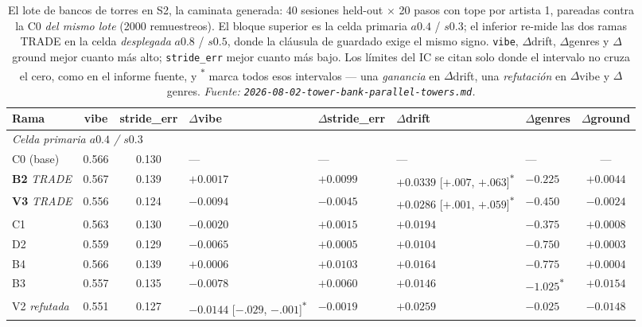 \documentclass[11pt]{article}
\begin{document}
\begin{table}[ht]
  \centering
  \caption{El lote de bancos de torres en S2, la caminata generada: \num{40}
  sesiones held-out $\times$ \num{20} pasos con tope por artista 1, pareadas
  contra la C0 \emph{del mismo lote} (\num{2000} remuestreos). El bloque superior
  es la celda primaria $a\num{0.4}$ / $s\num{0.3}$; el inferior re-mide las dos
  ramas TRADE en la celda \emph{desplegada} $a\num{0.8}$ / $s\num{0.5}$, donde la
  cláusula de guardado exige el mismo signo. \texttt{vibe}, $\Delta$drift,
  $\Delta$genres y $\Delta$ground mejor cuanto más alto; \texttt{stride\_err}
  mejor cuanto más bajo. Los límites del IC se citan solo donde el intervalo no
  cruza el cero, como en el informe fuente, y \textsuperscript{$\ast$} marca todos
  esos intervalos --- una \emph{ganancia} en $\Delta$drift, una
  \emph{refutación} en $\Delta$vibe y $\Delta$genres.
  \emph{Fuente: \texttt{2026-08-02-tower-bank-parallel-towers.md}.}}
  \label{tab:towerbank-s2}
  {\scriptsize\setlength{\tabcolsep}{2.6pt}\begin{tabular}{lccllllc}
    \toprule
    Rama & vibe & stride\_err & $\Delta$vibe & $\Delta$stride\_err & $\Delta$drift & $\Delta$genres & $\Delta$ground \\
    \midrule
    \multicolumn{8}{l}{\emph{Celda primaria $a\num{0.4}$ / $s\num{0.3}$}} \\
    C0 (base) & 0.566 & 0.130 & --- & --- & --- & --- & --- \\
    \textbf{B2} \emph{TRADE} & 0.567 & 0.139 & $+0.0017$ & $+0.0099$ & $\mathbf{+0.0339}$ [$+.007$, $+.063$]\textsuperscript{$\ast$} & $-0.225$ & $+0.0044$ \\
    \textbf{V3} \emph{TRADE} & 0.556 & 0.124 & $-0.0094$ & $-0.0045$ & $\mathbf{+0.0286}$ [$+.001$, $+.059$]\textsuperscript{$\ast$} & $-0.450$ & $-0.0024$ \\
    C1 & 0.563 & 0.130 & $-0.0020$ & $+0.0015$ & $+0.0194$ & $-0.375$ & $+0.0008$ \\
    D2 & 0.559 & 0.129 & $-0.0065$ & $+0.0005$ & $+0.0104$ & $-0.750$ & $+0.0003$ \\
    B4 & 0.566 & 0.139 & $+0.0006$ & $+0.0103$ & $+0.0164$ & $-0.775$ & $+0.0004$ \\
    B3 & 0.557 & 0.135 & $-0.0078$ & $+0.0060$ & $+0.0146$ & $\mathbf{-1.025}$\textsuperscript{$\ast$} & $+0.0154$ \\
    V2 \emph{refutada} & 0.551 & 0.127 & $\mathbf{-0.0144}$ [$-.029$, $-.001$]\textsuperscript{$\ast$} & $-0.0019$ & $+0.0259$ & $-0.025$ & $-0.0148$ \\

\end{tabular}}
\end{table}
\end{document}
